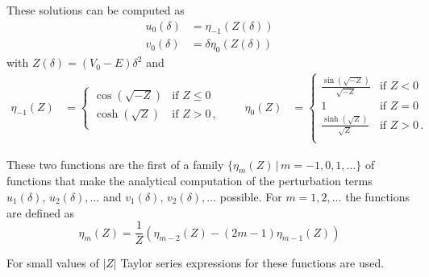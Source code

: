 These solutions can be computed as
\begin{align*}
  u_0(\delta) & = \eta_{-1}\left(Z(\delta)\right)      \\
  v_0(\delta) & = \delta\eta_{0}\left(Z(\delta)\right)
\end{align*} with \(Z(\delta) = (V_0-E)\delta^2\) and
\begin{align*}
  \eta_{-1}(Z) & = \begin{cases}
    \cos(\sqrt{-Z}) & \text{if } Z \leq 0 \\
    \cosh(\sqrt{Z}) & \text{if } Z > 0\,, \\
  \end{cases} \qquad
  \eta_{0}(Z)  & = \begin{cases}
    \frac{\sin(\sqrt{-Z})}{\sqrt{-Z}} & \text{if } Z < 0    \\
    1                                 & \text{if } Z = 0    \\
    \frac{\sinh(\sqrt{Z})}{\sqrt{Z}}  & \text{if } Z > 0\,. \\
  \end{cases}
\end{align*}

These two functions are the first of a family $\{ \eta_m(Z)\,|\,m=-1,0,1,\ldots\}$ of functions that make the analytical computation of the perturbation terms \(u_1(\delta),\, u_2(\delta), \dots\) and \(v_1(\delta),\, v_2(\delta), \dots\) possible.
For $m=1,2,\ldots$ the functions are defined as
\[ \eta_{m}(Z) = \frac{1}{Z}\left(\eta_{m-2}(Z) - (2m-1)\eta_{m-1}(Z)\right) \]

For small values of $|Z|$ Taylor series expressions for these functions are used.



